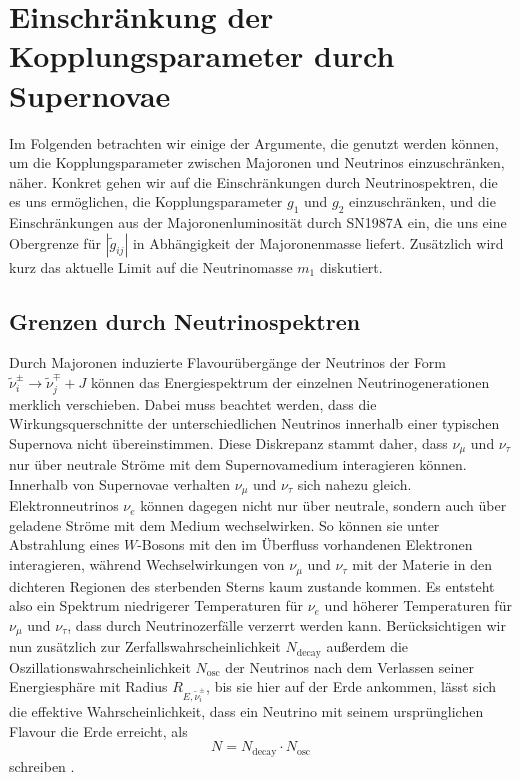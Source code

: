 
\chapter{Einschränkung der Kopplungsparameter durch Supernovae}

Im Folgenden betrachten wir einige der Argumente, die genutzt werden können, um die Kopplungsparameter zwischen Majoronen und Neutrinos einzuschränken, näher.
Konkret gehen wir auf die Einschränkungen durch Neutrinospektren, die es uns ermöglichen, die Kopplungsparameter $g_1$ und $g_2$ einzuschränken, und die Einschränkungen aus der Majoronenluminosität durch SN1987A ein,
die uns eine Obergrenze für $|\tilde{g}_{i j}|$ in Abhängigkeit der Majoronenmasse liefert.
Zusätzlich wird kurz das aktuelle Limit auf die Neutrinomasse $m_1$ diskutiert.

\section{Grenzen durch Neutrinospektren}
\label{subsec:spektrengrenzen}

Durch Majoronen induzierte Flavourübergänge der Neutrinos der Form $\tilde{\nu}^\pm_i \rightarrow \tilde{\nu}^\mp_j + J$ können das Energiespektrum der einzelnen Neutrinogenerationen merklich verschieben. 
Dabei muss beachtet werden, dass die Wirkungsquerschnitte der unterschiedlichen Neutrinos innerhalb einer typischen Supernova nicht übereinstimmen.
Diese Diskrepanz stammt daher, dass $\nu_\mu$ und $\nu_\tau$ nur über neutrale Ströme mit dem Supernovamedium interagieren können.
Innerhalb von Supernovae verhalten $\nu_\mu$ und $\nu_\tau$ sich nahezu gleich.
Elektronneutrinos $\nu_e$ können dagegen nicht nur über neutrale, sondern auch über geladene Ströme mit dem Medium wechselwirken.
So können sie unter Abstrahlung eines $W$-Bosons mit den im Überfluss vorhandenen Elektronen interagieren, während Wechselwirkungen von $\nu_\mu$ und $\nu_\tau$ mit der Materie in den dichteren Regionen des sterbenden Sterns kaum zustande kommen.
Es entsteht also ein Spektrum niedrigerer Temperaturen für $\nu_e$ und höherer Temperaturen für $\nu_\mu$ und $\nu_\tau$, dass durch Neutrinozerfälle verzerrt werden kann.
Berücksichtigen wir nun zusätzlich zur Zerfallswahrscheinlichkeit $N_\text{decay}$ außerdem die Oszillationswahrscheinlichkeit $N_\text{osc}$ der Neutrinos nach dem Verlassen seiner Energiesphäre mit Radius $R_{E, \tilde{\nu}^\pm_i}$, 
bis sie hier auf der Erde ankommen, lässt sich die effektive Wahrscheinlichkeit, dass ein Neutrino mit seinem ursprünglichen Flavour die Erde erreicht, als
\begin{equation}
    N = N_\text{decay} \cdot N_\text{osc}
    \label{eq:survivalprob}
\end{equation}
schreiben \cite{supernovaboundsdasandere}.


